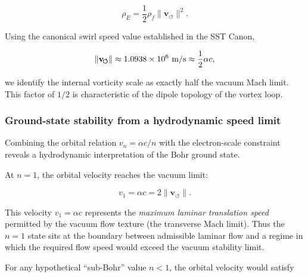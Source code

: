 \documentclass[10pt,reprint,aps,onecolumn,nofootinbib]{revtex4-2}
\begin{document}
            \begin{equation}
                \rho_{\!E}
                = \frac{1}{2}\rho_{\!f}
                \lVert \mathbf{v}_{\!\boldsymbol{\circlearrowleft}} \rVert^{2}.
            \end{equation}

            Using the canonical swirl speed value established in the SST Canon,

            \begin{equation}
                \lVert \mathbf{v}_{\!\boldsymbol{\circlearrowleft}}\rVert
                \approx 1.0938\times 10^{6}~{\rm m/s}
                \approx \frac{1}{2}\alpha c,
            \end{equation}

            we identify the internal vorticity scale as exactly half the vacuum Mach
            limit. This factor of $1/2$ is characteristic of the dipole topology
            of the vortex loop.

        \subsubsection*{Ground-state stability from a hydrodynamic speed limit}

            Combining the orbital relation $v_n = \alpha c / n$ with the
            electron-scale constraint reveals a hydrodynamic interpretation of the
            Bohr ground state.

            At $n=1$, the orbital velocity reaches the vacuum limit:

            \begin{equation}
                v_1 = \alpha c = 2 \lVert \mathbf{v}_{\!\boldsymbol{\circlearrowleft}}\rVert.
            \end{equation}

            This velocity $v_1 = \alpha c$ represents the \emph{maximum laminar
    translation speed} permitted by the vacuum flow texture (the transverse
            Mach limit). Thus the $n=1$ state sits at the boundary between
            admissible laminar flow and a regime in which the required flow speed
            would exceed the vacuum stability limit.

            For any hypothetical ``sub-Bohr'' value $n<1$, the orbital velocity
            would satisfy
\end{document}
